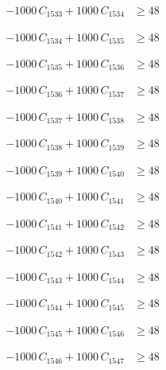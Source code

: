 \documentclass[a4paper,11pt]{article}
\begin{document}
\begin{align}
-1000\,C_{1533} + 1000\,C_{1534} &\geq 48 \nonumber
\end{align}

\begin{align}
-1000\,C_{1534} + 1000\,C_{1535} &\geq 48 \nonumber
\end{align}

\begin{align}
-1000\,C_{1535} + 1000\,C_{1536} &\geq 48 \nonumber
\end{align}

\begin{align}
-1000\,C_{1536} + 1000\,C_{1537} &\geq 48 \nonumber
\end{align}

\begin{align}
-1000\,C_{1537} + 1000\,C_{1538} &\geq 48 \nonumber
\end{align}

\begin{align}
-1000\,C_{1538} + 1000\,C_{1539} &\geq 48 \nonumber
\end{align}

\begin{align}
-1000\,C_{1539} + 1000\,C_{1540} &\geq 48 \nonumber
\end{align}

\begin{align}
-1000\,C_{1540} + 1000\,C_{1541} &\geq 48 \nonumber
\end{align}

\begin{align}
-1000\,C_{1541} + 1000\,C_{1542} &\geq 48 \nonumber
\end{align}

\begin{align}
-1000\,C_{1542} + 1000\,C_{1543} &\geq 48 \nonumber
\end{align}

\begin{align}
-1000\,C_{1543} + 1000\,C_{1544} &\geq 48 \nonumber
\end{align}

\begin{align}
-1000\,C_{1544} + 1000\,C_{1545} &\geq 48 \nonumber
\end{align}

\begin{align}
-1000\,C_{1545} + 1000\,C_{1546} &\geq 48 \nonumber
\end{align}

\begin{align}
-1000\,C_{1546} + 1000\,C_{1547} &\geq 48 \nonumber
\end{align}
\end{document}
